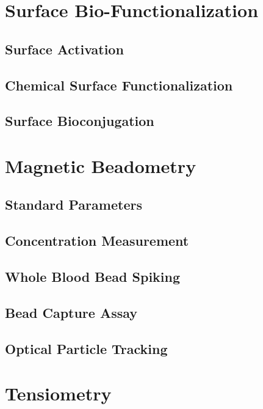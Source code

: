 \section{Surface Bio-Functionalization}

\subsection{Surface Activation}

\subsection{Chemical Surface Functionalization}

\subsection{Surface Bioconjugation}

\section{Magnetic Beadometry}

\subsection{Standard Parameters}

\subsection{Concentration Measurement}

\subsection{Whole Blood Bead Spiking}

\subsection{Bead Capture Assay}

\subsection{Optical Particle Tracking}

\section{Tensiometry}



